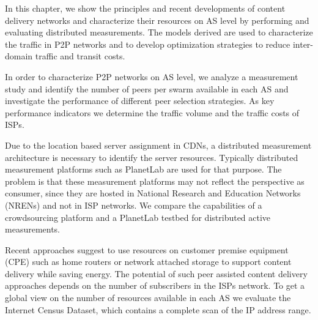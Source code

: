 

In this chapter, we show the principles and recent developments of content delivery networks and characterize their resources on AS level by performing and evaluating distributed measurements.
The models derived are used to characterize the traffic in P2P networks and to develop optimization strategies to reduce inter-domain traffic and transit costs.



In order to characterize P2P networks on AS level,
we analyze a measurement study and identify the number of peers per swarm available in each AS and investigate the performance of different peer selection strategies.
As key performance indicators we determine the traffic volume and the traffic costs of ISPs.

Due to the location based server assignment in CDNs, a distributed measurement architecture is necessary to identify the server resources.
Typically distributed measurement platforms such as PlanetLab are used for that purpose.
The problem is that these measurement platforms may not reflect the perspective as consumer, since they are hosted in National Research and Education Networks (NRENs) and not in ISP networks.
We compare the capabilities of a crowdsourcing platform and a PlanetLab testbed for distributed active measurements.

Recent approaches \cite{valancius2009greening} suggest to use resources on customer premise equipment (CPE) such as home routers or network attached storage to support content delivery while saving energy.
The potential of such peer assisted content delivery approaches depends on the number of subscribers in the ISPs network.
To get a global view on the number of resources available in each AS we evaluate the Internet Census Dataset, which contains a complete scan of the IP address range.

